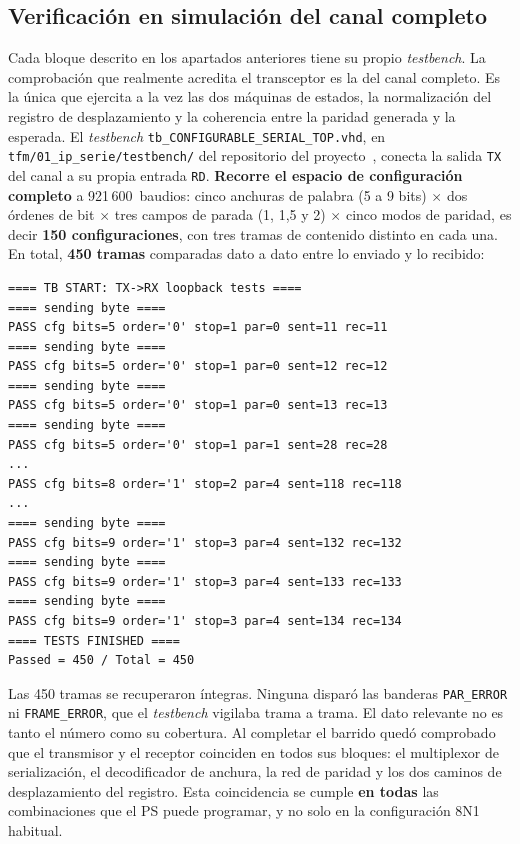 \subsection{Verificación en simulación del canal completo}
\label{sec:verificacion_canal}

Cada bloque descrito en los apartados anteriores tiene su propio \textit{testbench}. La
comprobación que realmente acredita el transceptor es la del canal completo. Es la única que
ejercita a la vez las dos máquinas de estados, la normalización del registro de desplazamiento y la
coherencia entre la paridad generada y la esperada. El \textit{testbench}
\texttt{tb\_CONFIGURABLE\_SERIAL\_TOP.vhd}, en \texttt{tfm/01\_ip\_serie/testbench/} del
repositorio del proyecto~\cite{repo_tfm}, conecta la salida \texttt{TX} del canal a su propia
entrada \texttt{RD}. \textbf{Recorre el espacio de configuración completo} a 921\,600~baudios:
cinco anchuras de palabra (5 a 9 bits) $\times$ dos órdenes de bit $\times$ tres campos de parada
(1, 1,5 y 2) $\times$ cinco modos de paridad, es decir \textbf{150 configuraciones}, con tres
tramas de contenido distinto en cada una. En total, \textbf{450 tramas} comparadas dato a dato
entre lo enviado y lo recibido:

\begin{lstlisting}[style=terminal, caption={Salida de la simulación de \texttt{tb\_CONFIGURABLE\_SERIAL\_TOP.vhd} (extracto)}]
==== TB START: TX->RX loopback tests ====
==== sending byte ====
PASS cfg bits=5 order='0' stop=1 par=0 sent=11 rec=11
==== sending byte ====
PASS cfg bits=5 order='0' stop=1 par=0 sent=12 rec=12
==== sending byte ====
PASS cfg bits=5 order='0' stop=1 par=0 sent=13 rec=13
==== sending byte ====
PASS cfg bits=5 order='0' stop=1 par=1 sent=28 rec=28
...
PASS cfg bits=8 order='1' stop=2 par=4 sent=118 rec=118
...
==== sending byte ====
PASS cfg bits=9 order='1' stop=3 par=4 sent=132 rec=132
==== sending byte ====
PASS cfg bits=9 order='1' stop=3 par=4 sent=133 rec=133
==== sending byte ====
PASS cfg bits=9 order='1' stop=3 par=4 sent=134 rec=134
==== TESTS FINISHED ====
Passed = 450 / Total = 450
\end{lstlisting}

Las 450 tramas se recuperaron íntegras. Ninguna disparó las banderas \texttt{PAR\_ERROR} ni
\texttt{FRAME\_ERROR}, que el \textit{testbench} vigilaba trama a trama. El dato relevante no es
tanto el número como su cobertura. Al completar el barrido quedó comprobado que el transmisor y
el receptor coinciden en todos sus bloques: el multiplexor de serialización, el decodificador de
anchura, la red de paridad y los dos caminos de desplazamiento del registro. Esta coincidencia se
cumple \textbf{en todas} las combinaciones que el PS puede programar, y no solo en la
configuración 8N1 habitual.

